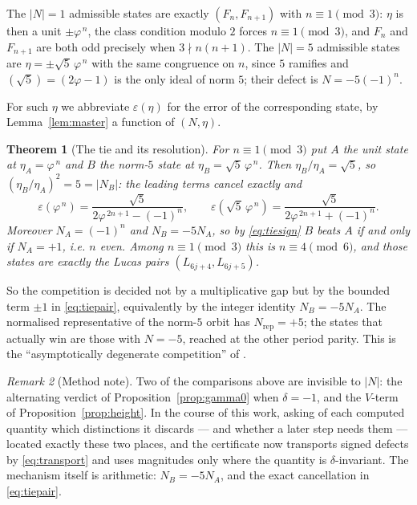 \documentclass[11pt]{article}
\newtheorem{theorem}{Theorem}[section]
\theoremstyle{definition}
\theoremstyle{remark}
\newtheorem{remark}[theorem]{Remark}
\begin{document}
The $|N|=1$ admissible states are exactly $(F_n,F_{n+1})$ with $n\equiv1\pmod3$: $\eta$ is then
a unit $\pm\varphi^{\,n}$, the class condition modulo $2$ forces $n\equiv1\pmod3$, and $F_n$ and
$F_{n+1}$ are both odd precisely when $3\nmid n(n+1)$. The $|N|=5$ admissible states are
$\eta=\pm\sqrt5\,\varphi^{\,n}$ with the same congruence on $n$, since $5$ ramifies and
$(\sqrt5)=(2\varphi-1)$ is the only ideal of norm $5$; their defect is $N=-5(-1)^n$.

For such $\eta$ we abbreviate $\varepsilon(\eta)$ for the error of the corresponding state, by
Lemma~\ref{lem:master} a function of $(N,\eta)$.

\begin{theorem}[The tie and its resolution]\label{thm:tie}
For $n\equiv1\pmod3$ put $A$ the unit state at $\eta_A=\varphi^{\,n}$ and $B$ the norm-$5$ state
at $\eta_B=\sqrt5\,\varphi^{\,n}$. Then $\eta_B/\eta_A=\sqrt5$, so
$(\eta_B/\eta_A)^2=5=|N_B|$: the leading terms cancel exactly and
\begin{equation}\label{eq:tiepair}
\varepsilon(\varphi^{\,n})=\frac{\sqrt5}{2\varphi^{\,2n+1}-(-1)^n},\qquad
\varepsilon(\sqrt5\,\varphi^{\,n})=\frac{\sqrt5}{2\varphi^{\,2n+1}+(-1)^n}.
\end{equation}
Moreover $N_A=(-1)^n$ and $N_B=-5N_A$, so by \eqref{eq:tiesign} $B$ beats $A$ if and only if
$N_A=+1$, i.e. $n$ even. Among $n\equiv1\pmod3$ this is $n\equiv4\pmod6$, and those states are
exactly the Lucas pairs $(L_{6j+4},L_{6j+5})$.
\end{theorem}

So the competition is decided not by a multiplicative gap but by the bounded term $\pm1$ in
\eqref{eq:tiepair}, equivalently by the integer identity $N_B=-5N_A$. The normalised
representative of the norm-$5$ orbit has $N_{\mathrm{rep}}=+5$; the states that actually win are
those with $N=-5$, reached at the other period parity. This is the ``asymptotically degenerate
competition'' of \cite[Remark 5.10]{DeJesus2026}.

\begin{remark}[Method note]\label{rem:signmethod}
Two of the comparisons above are invisible to $|N|$: the alternating verdict of
Proposition~\ref{prop:gamma0} when $\delta=-1$, and the $V$-term of
Proposition~\ref{prop:height}. In the course of this work, asking of each computed quantity
which distinctions it discards --- and whether a later step needs them --- located exactly these
two places, and the certificate now transports signed defects by \eqref{eq:transport} and uses
magnitudes only where the quantity is $\delta$-invariant. The mechanism itself is arithmetic:
$N_B=-5N_A$, and the exact cancellation in \eqref{eq:tiepair}.
\end{remark}
\end{document}

